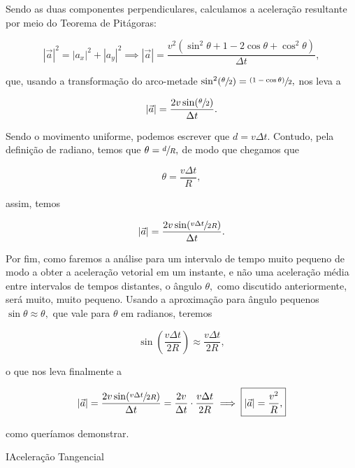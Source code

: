 \begin{exemplo}
Sendo as duas componentes perpendiculares, calculamos a aceleração resultante por meio do Teorema de Pitágoras:

$$ |\vec{a}|^2 = |a_x|^2 + |a_y|^2 \implies |\vec{a}|= \dfrac{v^2(\sin^2 \theta + 1 -2 \cos \theta + \cos^2 \theta)}{\Delta t},$$

\noindent que, usando a transformação do arco-metade $\sin^2 (\sfrac{\theta}{2}) = \sfrac{(1- \cos \theta)}{2},$ nos leva a

$$ |\vec{a}|= \dfrac{2v \sin (\sfrac{\theta}{2})}{\Delta t}. $$

Sendo o movimento uniforme, podemos escrever que $d=v \Delta t.$ Contudo, pela definição de radiano, temos que $\theta = \sfrac{d}{R},$ de modo que chegamos que

$$ \theta = \dfrac{v \Delta t}{R},$$

  \noindent assim, temos

  $$ |\vec{a}|= \dfrac{2v \sin (\sfrac{v \Delta t}{2R})}{\Delta t}.$$

  Por fim, como faremos a análise para um intervalo de tempo muito pequeno de modo a obter a aceleração vetorial em um instante, e não uma aceleração média entre intervalos de tempos distantes, o ângulo $\theta,$ como discutido anteriormente, será muito, muito pequeno. Usando a aproximação para ângulo pequenos $\sin \theta \approx \theta,$ que vale para $\theta$ em radianos, teremos

   $$\sin \left( \dfrac{v \Delta t}{2R} \right) \approx \dfrac{v \Delta t}{2R}, $$

   \noindent o que nos leva finalmente a

    $$ |\vec{a}|= \dfrac{2v \sin (\sfrac{v \Delta t}{2R})}{\Delta t} = \dfrac{2v}{\Delta t} \cdot \dfrac{v \Delta t}{2R} \implies \boxed{|\vec{a}|=\dfrac{v^2}{R},} $$

    \noindent como queríamos demonstrar.
  

    
\end{exemplo}















\begin{secnivel}{I}{Aceleração Tangencial}
  

\end{secnivel}







